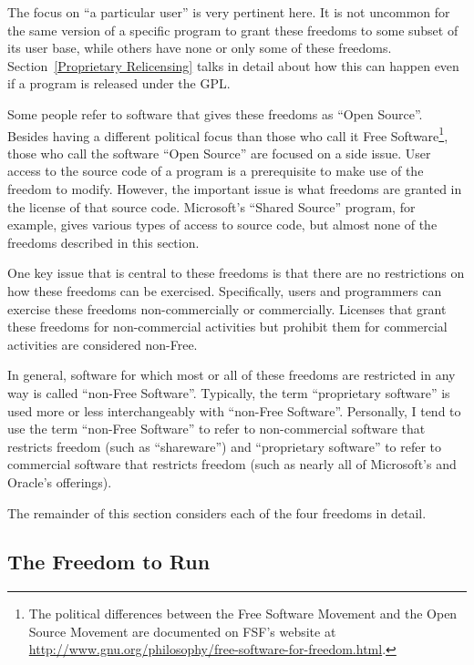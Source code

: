 \documentclass[12pt]{report}
\begin{document}
The focus on ``a particular user'' is very pertinent here.  It is not
uncommon for the same version of a specific program to grant these
freedoms to some subset of its user base, while others have none or only
some of these freedoms.  Section~\ref{Proprietary Relicensing} talks in
detail about how this can happen even if a program is released under the
GPL\@.

Some people refer to software that gives these freedoms as ``Open
Source''.  Besides having a different political focus than those who call
it Free Software\footnote{The political differences between the Free
Software Movement and the Open Source Movement are documented on FSF's
website at
\href{http://www.fsf.org/philosophy/free-software-for-freedom.html}
{http://www.gnu.org/philosophy/free-software-for-freedom.html}.},
those who call the software ``Open Source'' are focused on a side issue.
User access to the source code of a program is a prerequisite to make use
of the freedom to modify.  However, the important issue is what freedoms
are granted in the license of that source code.  Microsoft's ``Shared
Source'' program, for example, gives various types of access to source
code, but almost none of the freedoms described in this section.

One key issue that is central to these freedoms is that there are no
restrictions on how these freedoms can be exercised.  Specifically, users
and programmers can exercise these freedoms non-commercially or
commercially.  Licenses that grant these freedoms for non-commercial
activities but prohibit them for commercial activities are considered
non-Free.

In general, software for which most or all of these freedoms are
restricted in any way is called ``non-Free Software''.  Typically, the
term ``proprietary software'' is used more or less interchangeably with
``non-Free Software''.  Personally, I tend to use the term ``non-Free
Software'' to refer to non-commercial software that restricts freedom
(such as ``shareware'') and ``proprietary software'' to refer to
commercial software that restricts freedom (such as nearly all of
Microsoft's and Oracle's offerings).

The remainder of this section considers each of the four freedoms in
detail.

\subsection{The Freedom to Run}
\end{document}

